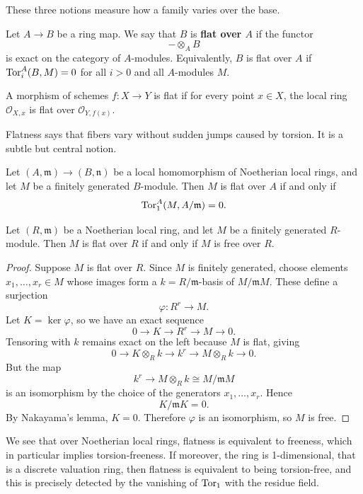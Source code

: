\documentclass[12pt]{article}
\begin{document}
These three notions measure how a family varies over the base.

\begin{definition}
    Let $A\to B$ be a ring map. We say that $B$ is \textbf{flat over $A$} if the functor
    \[
        -\otimes_A B
    \]
    is exact on the category of $A$-modules. Equivalently, $B$ is flat over $A$ if $\operatorname{Tor}^A_i(B,M)=0$ for all $i>0$ and all $A$-modules $M$.
\end{definition}

\begin{definition}
    A morphism of schemes $f:X\to Y$ is flat if for every point $x\in X$, the local ring $\mathcal O_{X,x}$ is flat over $\mathcal O_{Y,f(x)}$.
\end{definition}

Flatness says that fibers vary without sudden jumps caused by torsion. It is a subtle but central notion.

\begin{theorem}
    Let $(A,\mathfrak m)\to (B,\mathfrak n)$ be a local homomorphism of Noetherian local rings, and let $M$ be a finitely generated $B$-module. Then $M$ is flat over $A$ if and only if
    \[
        \operatorname{Tor}_1^A(M,A/\mathfrak m)=0.
    \]
\end{theorem}

\begin{corollary}
    Let $(R,\mathfrak m)$ be a Noetherian local ring, and let $M$ be a finitely generated $R$-module. Then $M$ is flat over $R$ if and only if $M$ is free over $R$.
\end{corollary}

\begin{proof}
    Suppose $M$ is flat over $R$. Since $M$ is finitely generated, choose elements
    $x_1,\dots,x_r\in M$ whose images form a $k=R/\mathfrak m$-basis of
    $M/\mathfrak m M$. These define a surjection
    \[
        \varphi:R^r\to M.
    \]
    Let $K=\ker\varphi$, so we have an exact sequence
    \[
        0\to K\to R^r\to M\to 0.
    \]
    Tensoring with $k$ remains exact on the left because $M$ is flat, giving
    \[
        0\to K\otimes_R k\to k^r\to M\otimes_R k\to 0.
    \]
    But the map
    \[
        k^r\to M\otimes_R k\cong M/\mathfrak m M
    \]
    is an isomorphism by the choice of the generators $x_1,\dots,x_r$. Hence
    \[
        K/\mathfrak m K=0.
    \]
    By Nakayama's lemma, $K=0$. Therefore $\varphi$ is an isomorphism, so $M$ is free.
\end{proof}
We see that over Noetherian local rings, flatness is equivalent to freeness, which in particular implies torsion-freeness. If moreover, the ring is 1-dimensional, that is a discrete valuation ring, then flatness is equivalent to being torsion-free, and this is precisely detected by the vanishing of $\operatorname{Tor}_1$ with the residue field.
\end{document}
